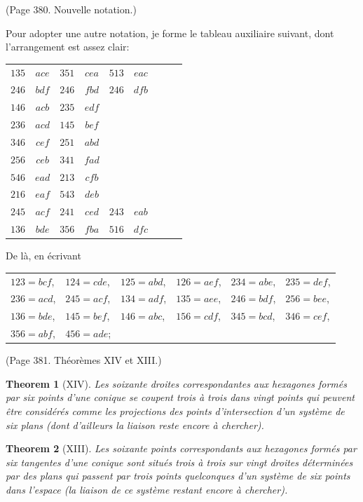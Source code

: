 \documentclass[11pt,a4paper]{article}
\theoremstyle{plain}
\newtheorem{theorem}{Theorem}
\theoremstyle{definition}
\begin{document}
(Page 380. Nouvelle notation.)

Pour adopter une autre notation, je forme le tableau auxiliaire suivant,
dont l'arrangement est assez clair:
\begin{center}
\begin{tabular}{ccc|ccc|ccc}
$135$ & $ace$ & $351$ & $cea$ & $513$ & $eac$ \\
$246$ & $bdf$ & $246$ & $fbd$ & $246$ & $dfb$ \\

$146$ & $acb$ & $235$ & $edf$ && \\
$236$ & $acd$ & $145$ & $bef$ && \\
$346$ & $cef$ & $251$ & $abd$ && \\
$256$ & $ceb$ & $341$ & $fad$ && \\
$546$ & $ead$ & $213$ & $cfb$ && \\
$216$ & $eaf$ & $543$ & $deb$ && \\
$245$ & $acf$ & $241$ & $ced$ & $243$ & $eab$ \\
$136$ & $bde$ & $356$ & $fba$ & $516$ & $dfc$
\end{tabular}
\end{center}

De l\`{a}, en \'{e}crivant
\begin{center}
\begin{tabular}{llllll}
$123 = bcf$, & $124 = cde$, & $125 = abd$, & $126 = aef$, & $234 = abe$, & $235 = def$, \\
$236 = acd$, & $245 = acf$, & $134 = adf$, & $135 = aee$, & $246 = bdf$, & $256 = bee$, \\
$136 = bde$, & $145 = bef$, & $146 = abc$, & $156 = cdf$, & $345 = bcd$, & $346 = cef$, \\
$356 = abf$, & $456 = ade$;
\end{tabular}
\end{center}

(Page 381. Th\'{e}or\`{e}mes XIV et XIII.)

\begin{theorem}[XIV]
Les soixante droites correspondantes aux hexagones form\'{e}s par six points
d'une conique se coupent trois \`{a} trois dans vingt points qui peuvent \^{e}tre
consid\'{e}r\'{e}s comme les projections des points d'intersection d'un syst\`{e}me de six plans
(dont d'ailleurs la liaison reste encore \`{a} chercher).
\end{theorem}

\begin{theorem}[XIII]
Les soixante points correspondants aux hexagones form\'{e}s par six tangentes
d'une conique sont situ\'{e}s trois \`{a} trois sur vingt droites d\'{e}termin\'{e}es par des plans
qui passent par trois points quelconques d'un syst\`{e}me de six points dans l'espace
(la liaison de ce syst\`{e}me restant encore \`{a} chercher).
\end{theorem}
\end{document}
